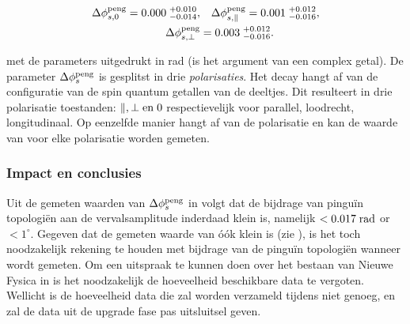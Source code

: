 
\begin{align}
\label{app_nl_delta_phis_result}
  \Delta\phi^{\rm peng}_{s,{0}}         = 0.000 \; ^{+0.010}_{-0.014}, &\quad  \Delta\phi^{\rm peng}_{s,{\parallel}} = 0.001 \; ^{+0.012}_{-0.016}, \nonumber \\
  \Delta\phi^{\rm peng}_{s,{\perp}}     &= 0.003 \; ^{+0.012}_{-0.016}.
\end{align}


\noindent met de parameters uitgedrukt in rad (\phis is het argument van een complex getal). De parameter $\Delta\phi_{s}^{\tiny\text{peng}}$ is gesplitst in drie {\it polarisaties}. Het decay  \BsJpsiPhi hangt af van de configuratie van de spin quantum getallen van de deeltjes. Dit resulteert in drie polarisatie toestanden: $\parallel,\perp {\rm en}\; 0$ respectievelijk voor parallel, loodrecht, longitudinaal. Op eenzelfde manier hangt \phis af van de polarisatie en kan de waarde van \phis voor elke polarisatie worden gemeten.

\subsubsection{Impact en conclusies}
Uit de gemeten waarden van $\Delta\phi_{s}^{\tiny\text{peng}}$ in  volgt dat de bijdrage van pingu\"in topologi\"en aan de \BsJpsiPhi vervalsamplitude inderdaad klein is, namelijk  $<0.017 \; {\rm rad}$ or $<1^\circ$. Gegeven dat de gemeten waarde van \phis \'o\'ok klein is (zie ), is het toch noodzakelijk rekening te houden met bijdrage van de pingu\"in topologi\"en wanneer \phis wordt gemeten. Om een uitspraak te kunnen doen over het bestaan van Nieuwe Fysica in \phis is het noodzakelijk de hoeveelheid beschikbare data te vergoten. Wellicht is de hoeveelheid data die zal worden verzameld tijdens \lhcb \runtwo niet genoeg, en zal de data uit de upgrade fase pas uitsluitsel geven.




%
%
%
